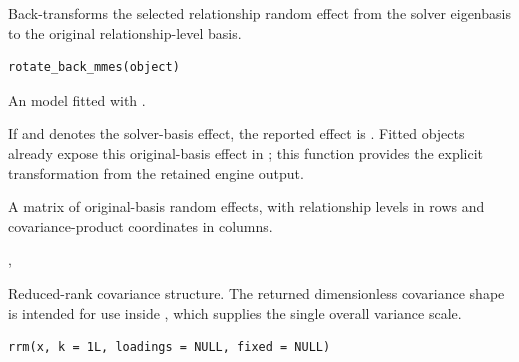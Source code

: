 \documentclass[a4paper]{book}
\begin{document}
%
\begin{Description}\relax
Back-transforms the selected relationship random effect from the solver
eigenbasis to the original relationship-level basis.
\end{Description}
%
\begin{Usage}
\begin{verbatim}
rotate_back_mmes(object)
\end{verbatim}
\end{Usage}
%
\begin{Arguments}
\begin{ldescription}
\item[\code{object}] An  model fitted with
.
\end{ldescription}
\end{Arguments}
%
\begin{Details}\relax
If  and  denotes the solver-basis effect, the
reported effect is . Fitted  objects already expose this
original-basis effect in ; this function provides the explicit
transformation from the retained engine output.
\end{Details}
%
\begin{Value}
A matrix of original-basis random effects, with relationship levels in rows
and covariance-product coordinates in columns.
\end{Value}
%
\begin{SeeAlso}\relax
{}, 
\end{SeeAlso}
%
\begin{Description}\relax
Reduced-rank covariance structure. The returned dimensionless covariance shape is intended for use inside , which supplies the single overall variance scale.
\end{Description}
%
\begin{Usage}
\begin{verbatim}
rrm(x, k = 1L, loadings = NULL, fixed = NULL)
\end{verbatim}
\end{Usage}
%
\end{document}

